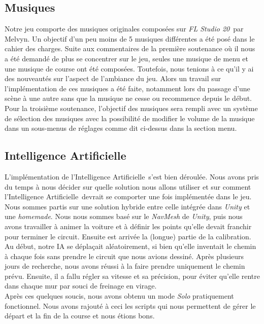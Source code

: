 \documentclass[12pt,a4paper]{article}
\newcommand{\AI}{Intelligence Artificielle}
\newcommand{\FL}{\textsl{FL Studio 20}}
\begin{document}
        \subsection{Musiques}
            Notre jeu comporte des musiques originales composées sur \FL\, par Melvyn. Un objectif d'un 
            peu moins de 5 musiques différentes a été posé dans le cahier des charges. Suite aux 
            commentaires de la première soutenance où il nous a été demandé de plus se concentrer sur le
            jeu, seules une musique de menu et une musique de course ont été composées. Toutefois, nous 
            tenions à ce qu'il y ai des nouveautés sur l'aspect de l'ambiance du jeu. Alors un travail 
            sur l'implémentation de ces musiques a été faite, notamment lors du passage d'une scène à
            une autre sans que la musique ne cesse ou recommence depuis le début. Pour la troisième 
            soutenance, l'objectif des musiques sera rempli avec un système de sélection des musiques 
            avec la possibilité de modifier le volume de la musique dans un sous-menus de réglages comme
            dit ci-dessus dans la section menu.


        \subsection{\AI}
            L'implémentation de l'\AI\, s'est bien déroulée. Nous avons pris du temps
            à nous décider sur quelle solution nous allons utiliser et sur comment
            l'\AI\, devrait se comporter une fois implémentée dans le jeu. Nous sommes partis sur une
            solution hybride entre celle intégrée dans \textsl{Unity} et une \textsl{homemade}.
            Nous nous sommes basé sur le \textsl{NavMesh} de \textsl{Unity}, puis nous avons
            travailler à animer la voiture et à définir les points qu'elle devait franchir pour
            terminer le circuit.  Ensuite est arrivée
            la (longue) partie de la calibration. Au début, notre IA se déplaçait aléatoirement,
            si bien qu'elle inventait le chemin à chaque fois sans prendre le circuit que nous
            avions dessiné. Après plusieurs jours de recherche, nous avons réussi à la faire
            prendre uniquement le chemin prévu. Ensuite, il a fallu régler sa vitesse et sa
            précision, pour éviter qu'elle rentre dans chaque mur par souci de freinage en virage.\\
            Après ces quelques soucis, nous avons obtenu un mode \textsl{Solo} pratiquement
            fonctionnel. Nous avons rajouté à ceci les scripts qui nous permettent de gérer
            le départ et la fin de la course et nous étions bons.
\end{document}
